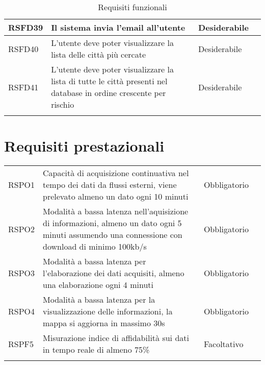 {\begin{center}
\begin{longtable}{|p{2.5cm}|p{4.5cm}|p{3.5cm}|p{4cm}|}
			\hline
			\centering RSFD39 & Il sistema invia l'email all'utente &\centering Desiderabile & \makecell[tc]{UC25} \\
			\hline
			\centering RSFD40 & L'utente deve poter visualizzare la lista delle città più cercate &\centering Desiderabile & \makecell[tc]{UC27} \\
			\hline
			\centering RSFD41 & L'utente deve poter visualizzare la lista di tutte le città presenti nel database in ordine crescente per rischio &\centering Desiderabile & \makecell[tc]{UC28} \\
			\hline
			\rowcolor{white}
			\caption[Requisiti funzionali]{Requisiti funzionali}\label{4.1}\\
	\end{longtable}%

\end{center}
\clearpage
\section{Requisiti prestazionali}\label{RequisitiPrestazionali}
\def\tabularxcolumn#1{m{#1}}
{

	\begin{center}
		\renewcommand{\arraystretch}{1.4}
		\begin{longtable}{|p{4cm}|p{4cm}|p{4cm}|p{3cm}|}
		\hline
		\rowcolor{airforceblue}
		\makecell[c]{\textbf{Codice RS}} & \makecell[c]{\textbf{Descrizione}} & \makecell[c]{\textbf{Tipo di requisito}} & \makecell[c]{\textbf{Fonte}} \\
		\hline
		\centering RSPO1 & Capacità di acquisizione continuativa nel tempo dei dati da flussi esterni, viene prelevato almeno un dato ogni 10 minuti &\centering  Obbligatorio & \makecell[tc]{Capitolato$_{\scaleto{G}{3pt}}$}  \\
		\hline
		\centering RSPO2 & Modalità a bassa latenza nell'aquisizione di informazioni, almeno un dato ogni 5 minuti assumendo una connessione con download di minimo 100kb/s & \centering Obbligatorio & \makecell[tc]{Interno} \\
		\hline
		\centering RSPO3 & Modalità a bassa latenza per l'elaborazione dei dati acquisiti, almeno una elaborazione ogni 4 minuti & \centering Obbligatorio & \makecell[tc]{Interno} \\
		\hline
		\centering RSPO4 & Modalità a bassa latenza per la visualizzazione delle informazioni, la mappa si aggiorna in massimo 30s & \centering Obbligatorio & \makecell[tc]{Interno} \\
		\hline
		\centering RSPF5 & Misurazione indice di affidabilità sui dati in tempo reale di almeno 75\% & \centering Facoltativo &\makecell[tc]{Interno} \\
		\hline
		\rowcolor{white}


\end{longtable}
\end{center}}}
